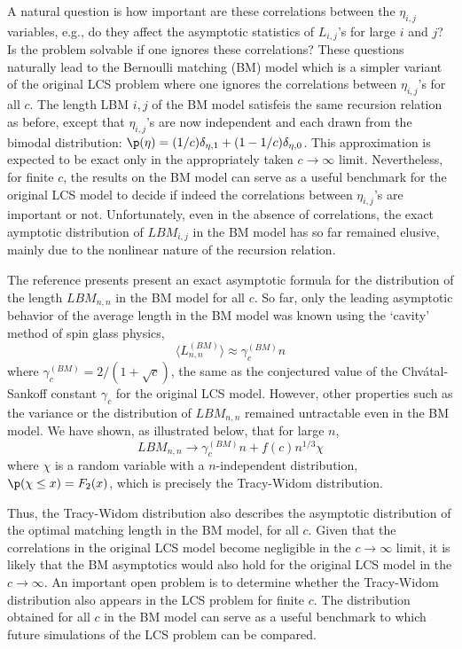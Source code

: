 A natural question is how important are these correlations between the $\eta_{i,j}$ variables, e.g., do they affect the asymptotic statistics of $L_{i,j}$’s for large $i$ and $j$? Is the problem solvable if one ignores these correlations? These questions naturally lead to the Bernoulli matching (BM) model which is a simpler variant of the original LCS problem where one ignores the correlations between $\eta_{i,j}$’s for all $c$. The length LBM $i,j$ of the BM model satisfeis the same recursion relation as before, except that $\eta_{i,j}$’s are now independent and each drawn from the bimodal distribution: $\p(\eta) = (1/c) \delta_{\eta,1} + (1-1/c) \delta_{\eta,0}$. This approximation is expected to be exact only in the appropriately taken $c \rightarrow \infty$ limit. Nevertheless, for finite $c$, the results on the BM model can serve as a useful benchmark for the original LCS model to decide if indeed the correlations between $\eta_{i,j}$’s are important or not. Unfortunately, even in the absence of correlations, the exact aymptotic distribution of $LBM_{i,j}$ in the BM model has so far remained elusive, mainly due to the nonlinear nature of the recursion relation. 

The reference presents present an exact asymptotic formula for the distribution of the length $LBM_{n,n}$ in the BM model for all $c$. So far, only the leading asymptotic behavior of the average length in the BM model was known using the ‘cavity’ method of spin glass physics,
\begin{equation}
	\langle L^{(BM)}_{n,n} \rangle \approx \gamma^{(BM)}_c n
\end{equation}
where $\gamma_c^{(BM)} = 2/(1+\sqrt{c})$, the same as the conjectured value of the Chvátal-Sankoff constant $\gamma_c$ for the original LCS model. However, other properties such as the variance or the distribution of $LBM_{n,n}$ remained untractable even in the BM model. We have shown, as illustrated below, that for large $n$,
\begin{equation}
	LBM_{n,n} \rightarrow \gamma^{(BM)}_c n + f(c) n^{1/3} \chi	
\end{equation}
where $\chi$ is a random variable with a $n$-independent distribution, $\p(\chi \leq x) = F_2(x)$, which is precisely the Tracy-Widom distribution.

Thus, the Tracy-Widom distribution also describes the asymptotic distribution of the optimal matching length in the BM model, for all $c$. Given that the correlations in the original LCS model become negligible in the $c \rightarrow \infty$ limit, it is likely that the BM asymptotics would also hold for the original LCS model in the $c \rightarrow \infty$. An important open problem is to determine whether the Tracy-Widom distribution also appears in the LCS problem for finite $c$. The distribution obtained for all $c$ in the BM model can serve as a useful benchmark to which future simulations of the LCS problem can be compared. 